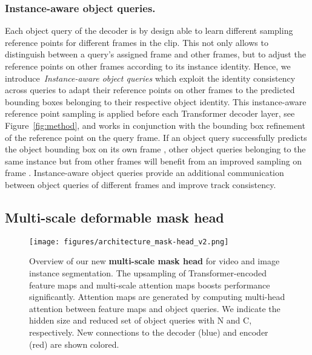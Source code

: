 \documentclass[runningheads]{llncs}
\begin{document}
\subsubsection{Instance-aware object queries.}
Each object query of the decoder is by design able to learn different sampling reference points for different frames in the clip.
This not only allows to distinguish between a query's assigned frame and other frames, but to adjust the reference points on other frames according to its instance identity.
Hence, we introduce~\textit{Instance-aware object queries} which exploit the identity consistency across queries to adapt their reference points on other frames to the predicted bounding boxes belonging to their respective object identity.
This instance-aware reference point sampling is applied before each Transformer decoder layer, see Figure~\ref{fig:method}, and works in conjunction with the bounding box refinement of the reference point on the query frame.
If an object query successfully predicts the object bounding box on its own frame , other object queries belonging to the same instance but from other frames will benefit from an improved sampling on frame . 
Instance-aware object queries provide an additional communication between object queries of different frames and improve track consistency.




















\subsection{Multi-scale deformable mask head}\label{sec:def_segme_head}

\begin{figure*}
    \centering


    \texttt{[image: figures/architecture\_mask-head\_v2.png]}
    
    \caption{
Overview of our new \textbf{multi-scale mask head} for video and image instance segmentation.
The upsampling of Transformer-encoded feature maps and multi-scale attention maps boosts performance significantly.
Attention maps are generated by computing multi-head attention between feature maps and object queries.
We indicate the hidden size and reduced set of object queries with N and C, respectively.
New connections to the decoder (blue) and encoder (red) are shown colored.
     }
    
    \label{fig:arch_mask-head}
\end{figure*} 
\end{document}
